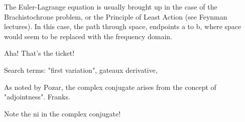 \documentclass[paper.tex]{subfiles}
\begin{document}
	
	




The Euler-Lagrange equation is usually brought up in the case of the Brachistochrone problem, or the Principle of Least Action (see Feynman lectures). In this case, the path through space, endpoints a to b, where space would seem to be replaced with the frequency domain. 

Aha! That's the ticket! 

Search terms: "first variation", gateaux derivative, 

As noted by Pozar, the complex conjugate arises from the concept of "adjointness". Franks.

Note the ni in the complex conjugate!
\end{document}
